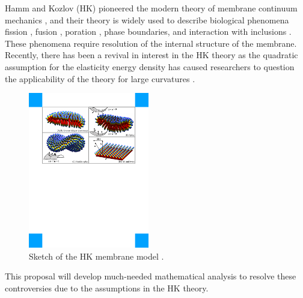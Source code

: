Hamm and Kozlov (HK) pioneered 
the modern theory of membrane continuum mechanics \cite{Hamm2000}, and their theory
is widely used to describe biological phenomena 
fission \cite{FrEsAkSh15, Maetal15, PhysRevE.79.031926},
fusion \cite{ChKo08, KoKo2002,Kuzmin7235,Aeffner2012},
poration \cite{Gaetal20}, phase boundaries, and interaction with inclusions
\cite{SeLeMaEg17,Saetal20, Pietal20}. These phenomena
require resolution of the internal structure of the membrane.  
Recently, there has been a revival in interest in the HK theory as the quadratic assumption
for the elasticity energy density has caused
researchers to question the applicability of the theory 
for large curvatures
\cite{PhysRevLett.117.188102, ARGUDO20161619}.
%
\begin{figure}
\centerline{\includegraphics[width=0.47\textwidth]{Figures/Deformations.pdf}}
  \vspace{-5pt}
\caption{\label{fig:deformations} \footnotesize Sketch of the HK
 membrane model \cite{Hamm2000}.}
\end{figure}
%
This proposal will develop much-needed mathematical analysis to resolve
these controversies due to the assumptions in the HK theory. 



